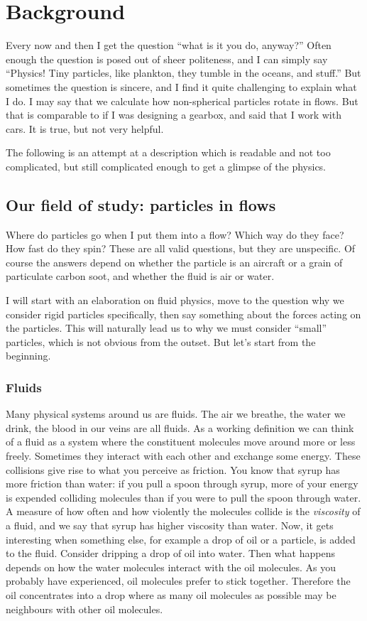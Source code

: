 \documentclass[thesis.tex]{subfiles}
\begin{document}
\chapter{Background}\label{sec:background}

Every now and then I get the question ``what is it you do, anyway?'' Often enough the question is posed out of sheer politeness, and I can simply say ``Physics! Tiny particles, like plankton, they tumble in the oceans, and stuff.'' But sometimes the question is sincere, and I find it quite challenging to explain what I do. I may say that we calculate how non-spherical particles rotate in flows. But that is comparable to if I was designing a gearbox, and said that I work with cars. It is true, but not very helpful. 

The following is an attempt at a description which is readable and not too complicated, but still complicated enough to get a glimpse of the physics.

\section{Our field of study: particles in flows}\label{sec:context}

Where do particles go when I put them into a flow? Which way do they face? How fast do they spin? These are all valid questions, but they are unspecific. Of course the answers depend on whether the particle is an aircraft or a grain of particulate carbon soot, and whether the fluid is air or water. 

I will start with an elaboration on fluid physics, move to the question why we consider rigid particles specifically, then say something about the forces acting on the particles. This will naturally lead us to why we must consider ``small'' particles, which is not obvious from the outset. But let's start from the beginning.

\subsection*{Fluids}

Many physical systems around us are fluids. The air we breathe, the water we drink, the blood in our veins are all fluids. As a working definition we can think of a fluid as a system where the constituent molecules move around more or less freely. Sometimes they interact with each other and exchange some energy. These collisions give rise to what you perceive as friction. You know that syrup has more friction than water: if you pull a spoon through syrup, more of your energy is expended colliding molecules than if you were to pull the spoon through water. A measure of how often and how violently the molecules collide is the \emph{viscosity} of a fluid, and we say that syrup has higher viscosity than water. Now, it gets interesting when something else, for example a drop of oil or a particle, is added to the fluid. Consider dripping a drop of oil into water. Then what happens depends on how the water molecules interact with the oil molecules. As you probably have experienced, oil molecules prefer to stick together. Therefore the oil concentrates into a drop where as many oil molecules as possible may be neighbours with other oil molecules.
\end{document}
